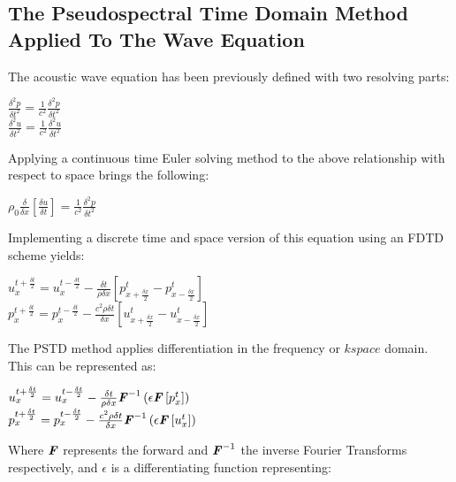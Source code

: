 \subsection{The Pseudospectral Time Domain Method Applied To The Wave Equation}

The acoustic wave equation has been previously defined with two resolving parts:\\
\begin{center}
$\frac{\delta^2 p}{\delta t^2} = \frac{1}{c^2} \frac{\delta^2 p}{\delta t^2}$\\
$\frac{\delta^2 u}{\delta t^2} = \frac{1}{c^2} \frac{\delta^2 u}{\delta t^2}$\\
\end{center}
Applying a continuous time Euler solving method to the above relationship with respect to space brings the following:\\
\begin{center}
$\rho_0 \frac{\delta}{\delta x}\left[\frac{\delta u}{\delta t}\right] =\frac{1}{c^2} \frac{\delta ^2 p}{\delta t^2} $\\
\end{center}
Implementing a discrete time and space version of this equation using an FDTD scheme yields:\\
\begin{center}
$u^{t + \frac{\delta t}{2}}_{x} = u^{t - \frac{\delta t}{2}}_{x} - \frac{\delta t}{\rho \delta x} \left[p^{t}_{x + \frac{\delta x}{2}} - p^{t}_{x - \frac{\delta x}{2}}\right]$\\
$p^{t + \frac{\delta t}{2}}_{x} = p^{t - \frac{\delta t}{2}}_{x} - \frac{c^2 \rho \delta t}{\delta x} \left[u^{t}_{x + \frac{\delta x}{2}} - u^{t}_{x - \frac{\delta x}{2}}\right]$\\
\end{center}
The PSTD method applies differentiation in the frequency or $ \textit{k} space$ domain. This can be represented as:\\
\begin{center}
$u^{t + \frac{\delta t}{2}}_{x} = u^{t - \frac{\delta t}{2}}_{x} - \frac{\delta t}{\rho \delta x} \textbf{\textit{F}}^{-1}\left(\epsilon \textbf{\textit{F}}\left[p^{t}_{x}\right] \right)$\\
$p^{t + \frac{\delta t}{2}}_{x} = p^{t - \frac{\delta t}{2}}_{x} - \frac{c^2 \rho \delta t}{\delta x} \textbf{\textit{F}}^{-1}\left( \epsilon \textbf{\textit{F}} \left[ u^{t}_{x} \right] \right)$\\
\end{center}
Where $\textbf{\textit{F}}$ represents the forward and $\textbf{\textit{F}}^{-1}$ the inverse Fourier Transforms respectively, and $\epsilon$ is a differentiating function representing:\\
